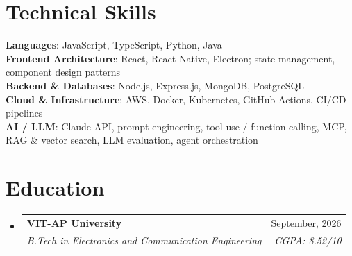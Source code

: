\documentclass[letterpaper,10.5pt]{article}
\makeatletter
\newcommand{\resumeSubheading}[4]{
\vspace{-2pt}\item
\begin{tabular*}{0.97\textwidth}[t]{l@{\extracolsep{\fill}}r}
\textbf{#1} & #2 \\
\textit{\small#3} & \textit{\small #4} \\
\end{tabular*}\vspace{-5pt}
}
\newcommand{\resumeSubHeadingListStart}{
\begin{itemize}[leftmargin=0.15in, label={}]
}
\newcommand{\resumeSubHeadingListEnd}{
\end{itemize}
}
\makeatother
\begin{document}
\section{Technical Skills}
\begin{itemize}[leftmargin=0.15in, label={}]
\small{\item{
\textbf{Languages}{: JavaScript, TypeScript, Python, Java} \\[0.3em]
\textbf{Frontend Architecture}{: React, React Native, Electron; state management, component design patterns} \\[0.3em]
\textbf{Backend \& Databases}{: Node.js, Express.js, MongoDB, PostgreSQL} \\[0.3em]
\textbf{Cloud \& Infrastructure}{: AWS, Docker, Kubernetes, GitHub Actions, CI/CD pipelines} \\[0.3em]
\textbf{AI / LLM}{: Claude API, prompt engineering, tool use / function calling, MCP, RAG \& vector search, LLM evaluation, agent orchestration}
}}
\end{itemize}


\section{Education}
\resumeSubHeadingListStart
\resumeSubheading
{VIT-AP University}{September, 2026}
{B.Tech in Electronics and Communication Engineering}{CGPA: 8.52/10}
\resumeSubHeadingListEnd
\end{document}
